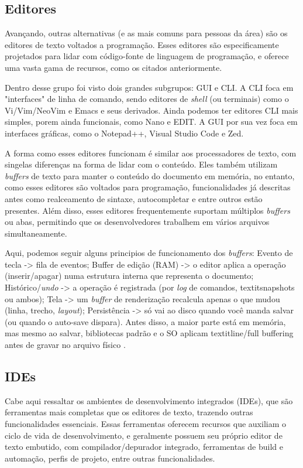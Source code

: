 \subsection{Editores}

Avançando, outras alternativas (e as mais comuns para pessoas da área) são os editores de
texto voltados a programação. Esses editores são especificamente projetados para lidar
com código-fonte de linguagem de programação, e oferece uma vasta gama de recursos, como
os citados anteriormente.

Dentro desse grupo foi visto dois grandes subgrupos: GUI e CLI. A CLI foca em "interfaces"
de linha de comando, sendo editores de \textit{shell} (ou terminais) como o Vi/Vim/NeoVim e
Emacs e seus derivados. Ainda podemos ter editores CLI mais simples, porem ainda funcionais,
como Nano e EDIT. A GUI por sua vez foca em interfaces gráficas, como o Notepad++,
Visual Studio Code e Zed.

A forma como esses editores funcionam é similar aos processadores de texto, com singelas diferenças
na forma de lidar com o conteúdo. Eles também utilizam \textit{buffers} de texto para manter o
conteúdo do documento em memória, no entanto, como esses editores são voltados para programação,
funcionalidades já descritas antes como realceamento de sintaxe, autocompletar e entre outros estão
presentes. Além disso, esses editores frequentemente suportam múltiplos \textit{buffers} ou
abas, permitindo que os desenvolvedores trabalhem em vários arquivos simultaneamente.

Aqui, podemos seguir alguns principios de funcionamento dos \textit{buffers}: Evento de tecla -> fila de eventos;
Buffer de edição (RAM) -> o editor aplica a operação (inserir/apagar) numa estrutura interna que representa o documento;
Histórico/\textit{undo} -> a operação é registrada (por \textit{log} de comandos, textit{snapshots} ou ambos);
Tela -> um \textit{buffer} de renderização recalcula apenas o que mudou (linha, trecho, \textit{layout});
Persistência -> só vai ao disco quando você manda salvar (ou quando o auto-save dispara). Antes disso, a maior
parte está em memória, mas mesmo ao salvar, bibliotecas padrão e o SO aplicam textit{line/full buffering} antes
de gravar no arquivo físico \cite{glibc-buffering-concepts}.

\subsection{IDEs}

Cabe aqui ressaltar os ambientes de desenvolvimento integrados (IDEs), que são
ferramentas mais completas que os editores de texto, trazendo outras funcionalidades
essenciais. Essas ferramentas oferecem recursos que auxiliam o ciclo de vida de
desenvolvimento, e geralmente possuem seu próprio editor de texto embutido, com
compilador/depurador integrado, ferramentas de build e automação, perfis de projeto,
entre outras funcionalidades.

